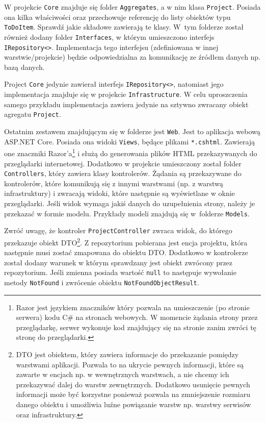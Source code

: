 W projekcie \texttt{Core} znajduje się folder \texttt{Aggregates}, a w nim klasa \texttt{Project}. Posiada ona kilka właściwości oraz przechowuje referencję do listy obiektów typu \texttt{ToDoItem}. Sprawdź jakie składowe zawierają te klasy. W~tym folderze został również dodany folder \texttt{Interfaces}, w którym umieszczono interfejs \texttt{IRepository<>}. Implementacja tego interfejsu (zdefiniowana w innej warstwie/projekcie) będzie odpowiedzialna za komunikację ze źródłem danych np. bazą danych.

Project \texttt{Core} jedynie zawierał interfejs \texttt{IRepository<>}, natomiast jego implementacja znajduje się w projekcie \texttt{Infrastructure}. W celu uproszczenia samego przykładu implementacja zawiera jedynie na sztywno zwracany obiekt agregatu \texttt{Project}.

Ostatnim zestawem znajdującym się w folderze jest \texttt{Web}. Jest to aplikacja webową ASP.NET Core. Posiada ona widoki \texttt{Views}, będące plikami \texttt{*.cshtml}. Zawierają one znaczniki Razor'a\footnote{Razor jest językiem znaczników który pozwala na umieszczenie (po stronie serwera) kodu C\# na stronach webowych. W momencie żądania strony przez przeglądarkę, serwer wykonuje kod znajdujący się na stronie zanim zwróci tę stronę do przeglądarki.} i służą do generowania plików HTML przekazywanych do przeglądarki internetowej. Dodatkowo w projekcie umieszczony został folder \texttt{Controllers}, który zawiera klasy kontrolerów. Żądania są przekazywane do kontrolerów, które komunikują się z innymi warstwami (np. z warstwą infrastruktury) i zwracają widoki, które następnie są wyświetlane w oknie przeglądarki. Jeśli widok wymaga jakiś danych do uzupełnienia strony, należy je przekazać w formie modelu. Przykłady modeli znajdują się w~folderze \texttt{Models}. 


Zwróć uwagę, że kontroler \texttt{ProjectController} zwraca widok, do którego przekazuje obiekt DTO\footnote{DTO jest obiektem, który zawiera informacje do przekazanie pomiędzy warstwami aplikacji. Pozwala to na ukrycie pewnych informacji, które są zawarte w encjach np. w wewnętrznych warstwach, a nie chcemy ich przekazywać dalej do warstw zewnętrznych. Dodatkowo usunięcie pewnych informacji może być korzystne ponieważ pozwala na zmniejszenie rozmiaru danego obiektu i umożliwia luźne powiązanie warstw np. warstwy serwisów oraz infrastruktury.}. Z repozytorium pobierana jest encja projektu, która następnie musi zostać zmapowana do obiektu DTO. Dodatkowo w kontrolerze został dodany warunek w którym sprawdzany jest obiekt zwrócony przez repozytorium. Jeśli zmienna posiada wartość \texttt{null} to następuje wywołanie metody \texttt{NotFound} i zwrócenie obiektu \texttt{NotFoundObjectResult}.

